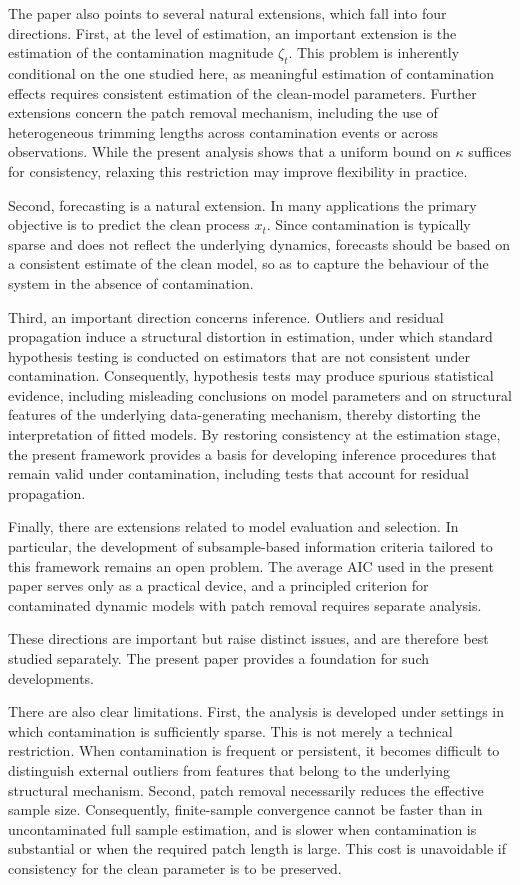 \documentclass[12pt]{article}
\numberwithin{equation}{section}
\begin{document}
The paper also points to several natural extensions, which fall into four directions.
First, at the level of estimation, an important extension is the estimation of the contamination magnitude $\zeta_t$. 
This problem is inherently conditional on the one studied here, as meaningful estimation of contamination effects requires consistent estimation of the clean-model parameters. 
Further extensions concern the patch removal mechanism, including the use of heterogeneous trimming lengths across contamination events or across observations. 
While the present analysis shows that a uniform bound on $\kappa$ suffices for consistency, relaxing this restriction may improve flexibility in practice.

Second, forecasting is a natural extension. 
In many applications the primary objective is to predict the clean process $x_t$.
Since contamination is typically sparse and does not reflect the underlying dynamics, forecasts should be based on a consistent estimate of the clean model, so as to capture the behaviour of the system in the absence of contamination.

Third, an important direction concerns inference. 
Outliers and residual propagation induce a structural distortion in estimation, under which standard hypothesis testing is conducted on estimators that are not consistent under contamination. 
Consequently, hypothesis tests may produce spurious statistical evidence,
including misleading conclusions on model parameters and on structural features of the underlying data-generating mechanism, thereby distorting the interpretation of fitted models.
By restoring consistency at the estimation stage, the present framework provides a basis for developing inference procedures that remain valid under contamination, including tests that account for residual propagation.

Finally, there are extensions related to model evaluation and selection. 
In particular, the development of subsample-based information criteria tailored to this framework remains an open problem. 
The average AIC used in the present paper serves only as a practical device, and a principled criterion for contaminated dynamic models with patch removal requires separate analysis.

These directions are important but raise distinct issues, and are therefore best studied separately. 
The present paper provides a foundation for such developments.

There are also clear limitations. 
First, the analysis is developed under settings in which contamination is sufficiently sparse. 
This is not merely a technical restriction. 
When contamination is frequent or persistent, it becomes difficult to distinguish external outliers from features that belong to the underlying structural mechanism. 
Second, patch removal necessarily reduces the effective sample size. 
Consequently, finite-sample convergence cannot be faster than in uncontaminated full sample estimation, and is slower when contamination is substantial or when the required patch length is large. 
This cost is unavoidable if consistency for the clean parameter is to be preserved.
\end{document}
